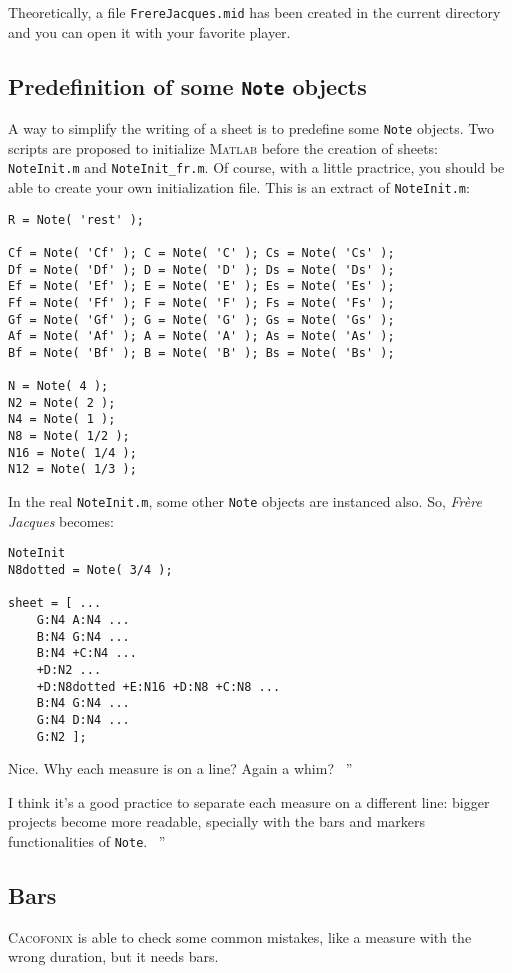 \documentclass{article}
\newcommand\cacofonix{\textsc{Cacofonix}\xspace}
\newcommand\matlab{\textsc{Matlab}\xspace}
\newcommand\note{\lstinline!Note!\xspace}
\newcommand\frerejaques{\emph{Fr\`ere Jacques}\xspace}
\newcommand\noteInitFile{\texttt{NoteInit.m}\xspace}
\newcommand\noteInitFrFile{\texttt{NoteInit\_fr.m}\xspace}
\newenvironment{meenv}{ \par \noindent \makebox[6em][r]{ \textcolor{mecolor}{Me}: `` --~}}{~''}
\newenvironment{myselfenv}{ \par \noindent \makebox[6em][r]{ \textcolor{myselfcolor}{Myself}: `` --~}}{~''}
\newcommand{ \me }[1]{%
\begin{meenv}%
	#1%
\end{meenv} }
\newcommand{ \myself }[1]{%
\begin{myselfenv}%
	#1%
\end{myselfenv} }
\begin{document}
Theoretically, a file \texttt{FrereJacques.mid} has been created in the current directory and you can open it with your favorite player.

\subsection{Predefinition of some \note objects}

A way to simplify the writing of a sheet is to predefine some \note objects. Two scripts are proposed to initialize \matlab before the creation of sheets: \noteInitFile and \noteInitFrFile. Of course, with a little practrice, you should be able to create your own initialization file. This is an extract of \noteInitFile:
\begin{lstlisting}
R = Note( 'rest' );

Cf = Note( 'Cf' ); C = Note( 'C' ); Cs = Note( 'Cs' );
Df = Note( 'Df' ); D = Note( 'D' ); Ds = Note( 'Ds' );
Ef = Note( 'Ef' ); E = Note( 'E' ); Es = Note( 'Es' );
Ff = Note( 'Ff' ); F = Note( 'F' ); Fs = Note( 'Fs' );
Gf = Note( 'Gf' ); G = Note( 'G' ); Gs = Note( 'Gs' );
Af = Note( 'Af' ); A = Note( 'A' ); As = Note( 'As' );
Bf = Note( 'Bf' ); B = Note( 'B' ); Bs = Note( 'Bs' );

N = Note( 4 );
N2 = Note( 2 );
N4 = Note( 1 );
N8 = Note( 1/2 );
N16 = Note( 1/4 );
N12 = Note( 1/3 );
\end{lstlisting}

In the real \noteInitFile, some other \note objects are instanced also. So, \frerejaques becomes:
\begin{lstlisting}
NoteInit
N8dotted = Note( 3/4 );

sheet = [ ...
	G:N4 A:N4 ...
	B:N4 G:N4 ...
	B:N4 +C:N4 ...
	+D:N2 ...
	+D:N8dotted +E:N16 +D:N8 +C:N8 ...
	B:N4 G:N4 ...
	G:N4 D:N4 ...
	G:N2 ];
\end{lstlisting}

\me{Nice. Why each measure is on a line? Again a whim?}
\myself{I think it's a good practice to separate each measure on a different line: bigger projects become more readable, specially with the bars and markers functionalities of \note.}

\subsection{Bars}

\cacofonix is able to check some common mistakes, like a measure with the wrong duration, but it needs bars.
\end{document}
